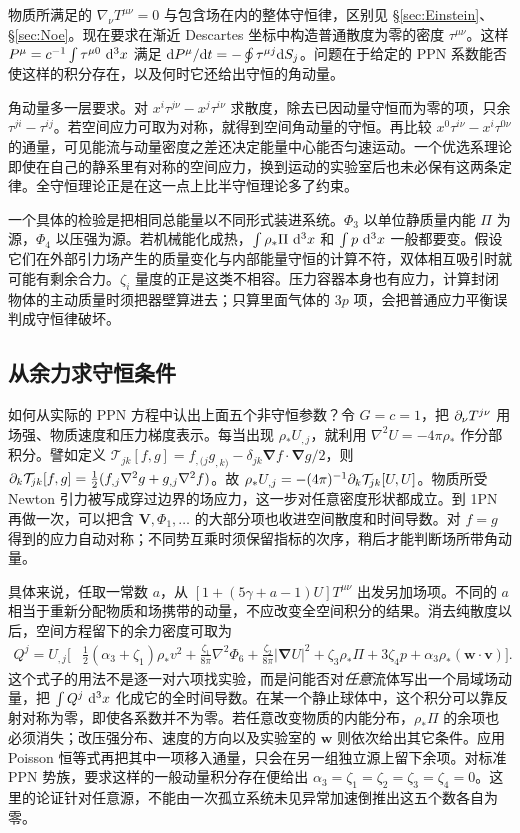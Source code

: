 物质所满足的 $\nabla_\nu T^{\mu\nu}=0$ 与包含场在内的整体守恒律，区别见 \S\ref{sec:Einstein}、\S\ref{sec:Noe}。现在要求在渐近 Descartes 坐标中构造普通散度为零的密度 $\tau^{\mu\nu}$。这样 $P^\mu=c^{-1}\int\tau^{\mu0}\,\dd[3]{x}$ 满足 $\dd P^\mu/\dd t=-\oint\tau^{\mu j}\dd S_j$。问题在于给定的 PPN 系数能否使这样的积分存在，以及何时它还给出守恒的角动量。

角动量多一层要求。对 $x^i\tau^{j\nu}-x^j\tau^{i\nu}$ 求散度，除去已因动量守恒而为零的项，只余 $\tau^{ji}-\tau^{ij}$。若空间应力可取为对称，就得到空间角动量的守恒。再比较 $x^0\tau^{i\nu}-x^i\tau^{0\nu}$ 的通量，可见能流与动量密度之差还决定能量中心能否匀速运动。一个优选系理论即使在自己的静系里有对称的空间应力，换到运动的实验室后也未必保有这两条定律。全守恒理论正是在这一点上比半守恒理论多了约束。

一个具体的检验是把相同总能量以不同形式装进系统。$\Phi_3$ 以单位静质量内能 $\Pi$ 为源，$\Phi_4$ 以压强为源。若机械能化成热，$\int\rho_*\Pi\,\dd[3]{x}$ 和 $\int p\,\dd[3]{x}$ 一般都要变。假设它们在外部引力场产生的质量变化与内部能量守恒的计算不符，双体相互吸引时就可能有剩余合力。$\zeta_i$ 量度的正是这类不相容。压力容器本身也有应力，计算封闭物体的主动质量时须把器壁算进去；只算里面气体的 $3p$ 项，会把普通应力平衡误判成守恒律破坏。

\subsection{从余力求守恒条件}

如何从实际的 PPN 方程中认出上面五个非守恒参数？令 $G=c=1$，把 $\partial_\nu T^{j\nu}$ 用场强、物质速度和压力梯度表示。每当出现 $\rho_* U_{,j}$，就利用 $\nabla^2 U=-4\pi\rho_*$ 作分部积分。譬如定义 $\mathcal T_{jk}[f,g]=f_{,(j}g_{,k)}-\delta_{jk}\bm\nabla f\cdot\bm\nabla g/2$，则 $\partial_k\mathcal T_{jk}[f,g] =\tfrac12(f_{,j}\nabla^2g+g_{,j}\nabla^2f)$。故 $\rho_* U_{,j}=-(4\pi)^{-1}\partial_k\mathcal T_{jk}[U,U]$。物质所受 Newton 引力被写成穿过边界的场应力，这一步对任意密度形状都成立。到 1PN 再做一次，可以把含 $\bm V,\Phi_1,\ldots$ 的大部分项也收进空间散度和时间导数。对 $f=g$ 得到的应力自动对称；不同势互乘时须保留指标的次序，稍后才能判断场所带角动量。

具体来说，任取一常数 $a$，从 $[1+(5\gamma+a-1)U]T^{\mu\nu}$ 出发另加场项。不同的 $a$ 相当于重新分配物质和场携带的动量，不应改变全空间积分的结果。消去纯散度以后，空间方程留下的余力密度可取为
\begin{align*}
 Q^j=U_{,j}\bigg[&\tfrac12(\alpha_3+\zeta_1)\rho_*v^2
 +\frac{\zeta_1}{8\pi}\nabla^2\Phi_6
 +\frac{\zeta_2}{8\pi}|\bm\nabla U|^2
 +\zeta_3\rho_*\Pi+3\zeta_4p
 +\alpha_3\rho_*(\bm w\cdot\bm v)\bigg].
\end{align*}
这个式子的用法不是逐一对六项找实验，而是问能否对\emph{任意}流体写出一个局域场动量，把 $\int Q^j\,\dd[3]{x}$ 化成它的全时间导数。在某一个静止球体中，这个积分可以靠反射对称为零，即使各系数并不为零。若任意改变物质的内能分布，$\rho_*\Pi$ 的余项也必须消失；改压强分布、速度的方向以及实验室的 $\bm w$ 则依次给出其它条件。应用 Poisson 恒等式再把其中一项移入通量，只会在另一组独立源上留下余项。对标准 PPN 势族，要求这样的一般动量积分存在便给出 $\alpha_3=\zeta_1=\zeta_2=\zeta_3=\zeta_4=0$。这里的论证针对任意源，不能由一次孤立系统未见异常加速倒推出这五个数各自为零。

